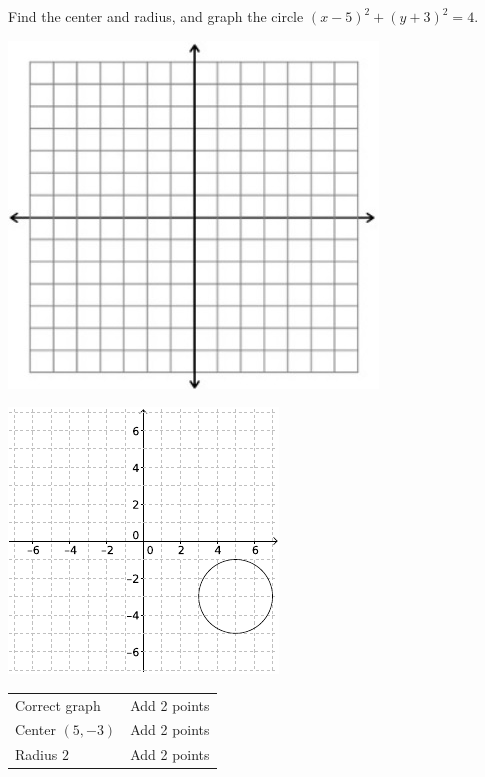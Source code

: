 {
	Find the center and radius, and graph the circle $(x-5)^2+(y+3)^2=4$.\begin{onlyproblem}\begin{center}\includegraphics{fig-graphpaper.png}\end{center}\end{onlyproblem} \begin{onlysolution}\begin{center}\includegraphics{fig100-20-c-answer}\end{center}\end{onlysolution}
}
{
	\begin{tabular}{l l}
	Correct graph & Add 2 points\\
	Center $(5, -3)$ & Add 2 points\\
	Radius $2$ & Add 2 points
	\end{tabular}
}

